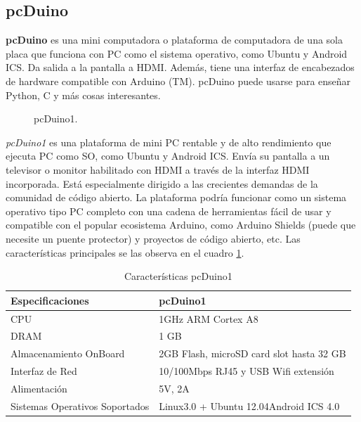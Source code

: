 \documentclass[conference]{IEEEtran}
\begin{document}
\subsection{pcDuino}
	\textbf{pcDuino} es una mini computadora o plataforma de computadora de una sola placa que funciona con PC como el sistema operativo, como Ubuntu y Android ICS. Da salida a la pantalla a HDMI. Además, tiene una interfaz de encabezados de hardware compatible con Arduino (TM). pcDuino puede usarse para enseñar Python, C y más cosas interesantes.\\
	\begin{figure}[h]
	\caption{pcDuino1.}
	\label{fig:ant01}
\end{figure}
	\textit{pcDuino1} es una plataforma de mini PC rentable y de alto rendimiento que ejecuta PC como SO, como Ubuntu y Android ICS. Envía su pantalla a un televisor o monitor habilitado con HDMI a través de la interfaz HDMI incorporada. Está especialmente dirigido a las crecientes demandas de la comunidad de código abierto. La plataforma podría funcionar como un sistema operativo tipo PC completo con una cadena de herramientas fácil de usar y compatible con el popular ecosistema Arduino, como Arduino Shields (puede que necesite un puente protector) y proyectos de código abierto, etc. Las características principales se las observa en el cuadro \ref{tab:pcd01}.\\
			\begin{table}[h]
\begin{center}
	\begin{tabular}{|p{2.5cm}|p{5.5cm}|}
	\hline
	\textbf{Especificaciones} &\textbf{pcDuino1} \\ \hline
	CPU  &1GHz ARM Cortex A8\\\hline
	DRAM &1 GB \\\hline
	Almacenamiento OnBoard &2GB Flash, microSD card slot hasta 32 GB \\\hline
	Interfaz de Red & 10/100Mbps RJ45 y USB Wifi extensión\\\hline
	Alimentación &5V, 2A\\\hline
	Sistemas Operativos Soportados &Linux3.0 + Ubuntu 12.04Android ICS 4.0\\\hline
\end{tabular}\vspace{0.25cm}
\caption{Características pcDuino1}
\label{tab:pcd01}
\end{center}
\end{table}
\end{document}
